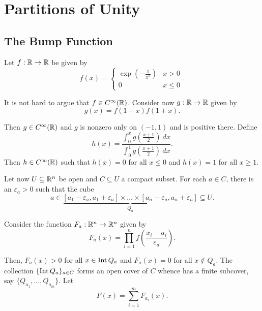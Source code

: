 \section{Partitions of Unity}

\subsection{The Bump Function}

Let $f: \mathbb{R}\to\mathbb{R}$ be given by 
\begin{equation*}
    f(x) = 
    \begin{cases}
        \exp\left(-\frac{1}{x^2}\right) & x > 0\\
        0 & x \le 0
    \end{cases}
    .
\end{equation*}

It is not hard to argue that $f\in C^\infty(\mathbb{R})$. Consider now $g: \mathbb{R}\to\mathbb{R}$ given by 
\begin{equation*}
    g(x) = f(1 - x)f(1 + x).
\end{equation*}

Then $g\in C^\infty(\mathbb{R})$ and $g$ is nonzero only on $(-1,1)$ and is positive there. Define 
\begin{equation*}
    h(x) = \frac{\int_0^x g\left(\frac{x + 1}{2}\right)~dx}{\int_0^1g\left(\frac{x + 1}{2}\right)~dx}.
\end{equation*}
Then $h\in C^\infty(\mathbb{R})$ such that $h(x) = 0$ for all $x\le 0$ and $h(x) = 1$ for all $x\ge 1$.

Let now $U\subseteq\mathbb{R}^n$ be open and $C\subseteq U$ a compact subset. For each $a\in C$, there is an $\varepsilon_a > 0$ such that the cube 
\begin{equation*}
    a\in \underbrace{[a_1 - \varepsilon_a,a_1 + \varepsilon_a]\times\dots\times[a_n - \varepsilon_a, a_n + \varepsilon_a]}_{Q_a}\subseteq U.
\end{equation*}

Consider the function $F_a: \mathbb{R}^n\to\mathbb{R}^n$ given by 
\begin{equation*}
    F_a(x) = \prod_{i = 1}^n f\left(\frac{x_i - a_i}{\varepsilon_a}\right).
\end{equation*}

Then, $F_a(x) > 0$ for all $x\in\operatorname{Int} Q_a$ and $F_a(x) = 0$ for all $x\notin Q_a$. The collection $\{\operatorname{Int} Q_a\}_{a\in C}$ forms an open cover of $C$ whence has a finite subcover, say $\{Q_{a_1},\dots,Q_{a_m}\}$. Let 
\begin{equation*}
    F(x) = \sum_{i = 1}^m F_{a_i}(x).
\end{equation*}

